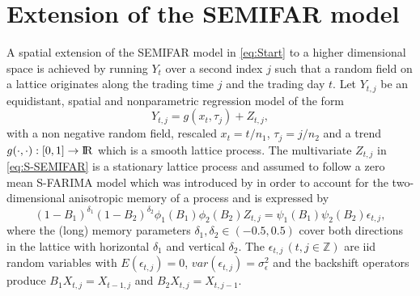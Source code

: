 \documentclass[12pt]{article}
\begin{document}
\section{Extension of the SEMIFAR model} 
A spatial extension of the SEMIFAR model in \eqref{eq:Start} to a higher dimensional space is achieved 
by running \(Y_{t}\) over a second index \(j\) such that a random field on a lattice originates along the trading time \(j\) and the trading day \(t\).   
Let \(Y_{t,j}\) be an equidistant, spatial and nonparametric regression model of the form
\begin{equation}
\label{eq:S-SEMIFAR}
Y_{t,j} = g(x_{t},\tau_{j}) + Z_{t,j},
\end{equation} 
with a non negative random field, rescaled \(x_t = t/n_1\), \(\tau_j = j/n_2\) and a trend \(g(\cdot,\cdot) : [0,1] \rightarrow {\rm I\!R} \) which is a smooth lattice process.
The multivariate \(Z_{t,j}\) in \eqref{eq:S-SEMIFAR} is a stationary lattice process and assumed to follow a zero mean S-FARIMA model 
which was introduced by \textcite{beran2009least} in order to account for the two-dimensional anisotropic memory of a process and is expressed by 
%
\begin{equation} 
\label{eq:S-FARIMA}
		(1-B_1)^{\delta_1} (1-B_2)^{\delta_2} \phi_1(B_1) \phi_2(B_2) Z_{t,j} = \psi_1(B_1) \psi_2(B_2)  \epsilon_{t,j},
\end{equation}
where the (long) memory parameters \(\delta_1,\delta_2 \in (-0.5,0.5) \) cover both directions in the lattice with horizontal \( \delta_1 \)  and vertical \( \delta_2 \).
The \(\epsilon_{t,j}\,(t,j \in \mathbb{Z})\) are iid random variables with \(E(\epsilon_{t,j}) = 0\), \( var(\epsilon_{t,j}) = \sigma_{\epsilon}^{2}  \) and the backshift operators produce \(B_1 X_{t,j} = X_{t-1,j}\) and \(B_2 X_{t,j} = X_{t,j-1}\).
\end{document}

